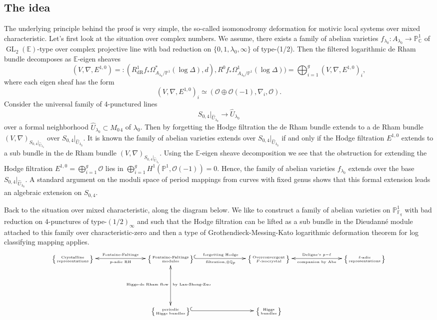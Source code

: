 \documentclass[12pt,twoside]{book}
\theoremstyle{plain}
\theoremstyle{definition}
\theoremstyle{remark}
\newcommand{\bC}{{\mathbb C}}
\newcommand{\bP}{{\mathbb P}}
\newcommand{\bQ}{{\mathbb Q}}
\newcommand{\mO}{{\mathcal O}}
\DeclareMathOperator\GL{GL}
\newcommand{\dR}{\mathrm{dR}}
\numberwithin{equation}{section}
\def\EK{{\mathbb E}}
\begin{document}
\subsection{The idea}

The underlying principle behind the proof is very simple, the so-called isomonodromy deformation for motivic local systems over mixed characteristic.
Let's first look at the situation over complex numbers. We assume, there exists a family of abelian varieties
$f_{\lambda_0}\colon A_{\lambda_0}\to \bP^1_\bC$ of $\GL_2(\EK)$-type over complex projective line with bad reduction on $\{0,1,\lambda_0,\infty\}$ of type-(1/2).
Then the filtered logarithmic de Rham bundle decomposes as $\EK$-eigen sheaves
\[(V,\nabla,E^{1,0})=:( R^1_\dR f_* \Omega^*_{A_{\lambda_0}/\bP^1}(\log \Delta),d),R^0f_* \Omega^1_{A_{\lambda_0}/\bP^1}(\log \Delta))=\bigoplus_{i=1}^g(V,\nabla,E^{1,0})_i,\]
where each eigen sheaf has the form
\[(V,\nabla,E^{1,0})_i\simeq (\mO\oplus \mO(-1),\nabla_i,\mO). \]
Consider the universal family of 4-punctured lines
\[S_{0,4}|_{\hat U_{\lambda_0}}\to \hat U_{\lambda_0}\]
over a formal neighborhood $\hat U_{\lambda_0}\subset M_{0\,4}$ of $\lambda_0$.
Then by forgetting the Hodge filtration the de Rham bundle extends to a de Rham bundle
$(V,\nabla)_{S_{0,4}|_{\hat U_{\lambda_0}}}$
over $S_{0,4}|_{\hat U_{\lambda_0}}$. It is known the family of abelian varieties extends over $S_{0,4}|_{{\hat U_{\lambda_0}}}$
if and only if the Hodge filtration $E^{1,0}$ extends to a sub bundle in the de Rham bundle $(V,\nabla)_{S_{0,4}|_{\hat U_{\lambda_0}}}$. Using the $\EK$-eigen sheave decomposition we see that the obstruction for extending the Hodge filtration $E^{1,0}=\bigoplus_{i=1}^g \mO$
lies in
$\bigoplus_{i=1}^g H^1(\bP^1,\mO(-1))=0$. Hence, the family of abelian varieties $f_{\lambda_0}$
extends over the base $S_{0,4}|_{\hat U_{\lambda_0}}$. A standard argument on the moduli space of period mappings from curves with fixed genus shows that this formal extension leads an algebraic extension on $S_{0,4}$.

Back to the situation over mixed characteristic, along the diagram below. We like to construct a family of abelian varieties on $\mathbb P^1_{\mathbb F_q}$ with bad reduction on 4-punctures of type-$(1/2)_\infty$ and such that the Hodge filtration can be lifted as a sub bundle in the Dieudann\'e module attached to this family over characteristic-zero and then a type of Grothendieck-Messing-Kato logarithmic deformation theorem for log classifying mapping applies.
\[\tiny \xymatrix@C=2.5cm @ R=2cm{
\left\{\text{Crystalline}\atop \text{representations}\right\}
\ar@{<->}[r]^-{\text{Fontaine-Faltings}}_-{p\text{\rm-adic RH}}
& \left\{\text{Fontaine-Faltings}\atop \text{modules}\right\}
\ar@{^(->}[r]^-{\text{forgetting Hodge}}_-{\text{filtration,}\otimes \bQ_p}
\ar@{<->}[d]_{\text{Higgs-de Rham flow}}^{\text{by Lan-Sheng-Zuo}}
& \left\{\text{Overconvergent}\atop \text{$F$-isocrystal}\right\}
\ar@{<->}[r]^{\text{Deligne's } p-\ell}_{\text{companion by Abe}}
& \left\{\text{$\ell$-adic}\atop \text{representations}\right\} \\
& \left\{\text{periodic}\atop \text{Higgs bundles}\right\} \ar@{^(->}[r]
& \left\{\text{Higgs}\atop \text{bundles}\right\}
& \\
}\]
\end{document}
